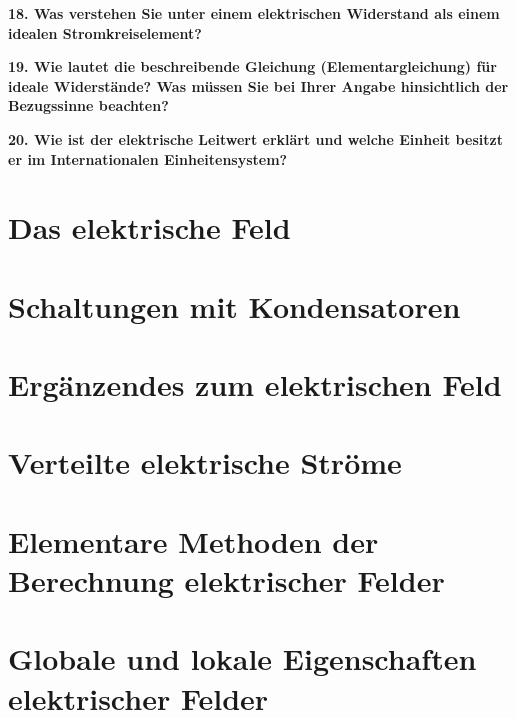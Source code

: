 \documentclass[12pt,a4paper,twoside]{book}
\newcommand{\nqu}[1]{\vspace*{10mm} \noindent \textbf{#1} \par \vspace*{1mm}}
\begin{document}
\nqu{18. Was verstehen Sie unter einem elektrischen Widerstand als einem idealen Stromkreiselement?}

\nqu{19. Wie lautet die beschreibende Gleichung (Elementargleichung) für ideale Widerstände? Was müssen Sie bei Ihrer Angabe hinsichtlich der Bezugssinne beachten?}

\nqu{20. Wie ist der elektrische Leitwert erklärt und welche Einheit besitzt er im Internationalen Einheitensystem?}

\chapter{Das elektrische Feld}


\chapter{Schaltungen mit Kondensatoren}


\chapter{Ergänzendes zum elektrischen Feld}


\chapter{Verteilte elektrische Ströme}


\chapter{Elementare Methoden der Berechnung elektrischer Felder}


\chapter{Globale und lokale Eigenschaften elektrischer Felder}
\end{document}
